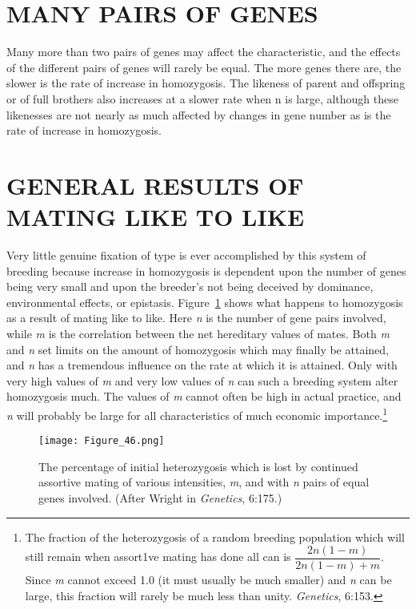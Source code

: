 \section*{MANY PAIRS OF GENES}

Many more than two pairs of genes may affect the characteristic,
and the effects of the different pairs of genes will rarely be equal. The
more genes there are, the slower is the rate of increase in homozygosis.
The likeness of parent and offspring or of full brothers also increases at
a slower rate when n is large, although these likenesses are not nearly
as much affected by changes in gene number as is the rate of increase in
homozygosis.

\section*{GENERAL RESULTS OF MATING LIKE TO LIKE}

Very little genuine fixation of type is ever accomplished by this system
of breeding because increase in homozygosis is dependent upon the
number of genes being very small and upon the breeder's not being
deceived by dominance, environmental effects, or epistasis.
Figure~\ref{fig:Lush_Figure_46} shows what happens to homozygosis as a
result of mating like to like. Here \textit{n} is the number of gene pairs
involved, while \textit{m} is the correlation between the net hereditary
values of mates. Both \textit{m} and \textit{n} set limits on the amount
of homozygosis which may finally be attained, and \textit{n} has a
tremendous influence on the rate at which it is attained. Only with very
high values of \textit{m} and very low values of \textit{n} can such a
breeding system alter homozygosis much. The values of \textit{m} cannot
often be high in actual practice, and \textit{n} will probably be large 
for all characteristics of much economic importance.\footnote{The fraction
of the heterozygosis of a random breeding population which will still
remain when assort1ve mating has done all can is $\dfrac{2n(1 - m)}{2n(1 - m)+m}$.
Since \textit{m} cannot exceed 1.0 (it must usually be much smaller) and
\textit{n} can be large, this fraction will rarely be much less than unity.
\textit{Genetics}, 6:153.}

\begin{figure}
	\centering
    \texttt{[image: Figure\_46.png]}
    \caption{The percentage of initial heterozygosis which is lost by continued assortive
			 mating of various intensities, \textit{m}, and with \textit{n} pairs of equal
			 genes involved. (After Wright in \textit{Genetics}, 6:175.)}
    \label{fig:Lush_Figure_46}
\end{figure}


